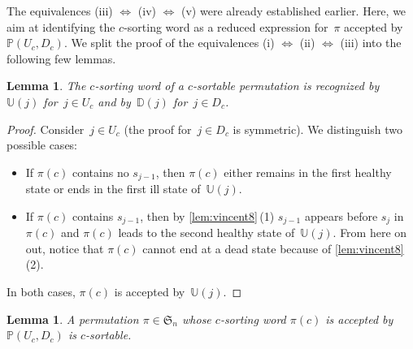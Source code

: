 \documentclass{amsart}
\newtheorem{lemma}[theorem]{Lemma}
\newcommand{\fS}{\mathfrak{S}} %
\newcommand{\automatonP}{\mathbb{P}} %
\newcommand{\automatonU}{\mathbb{U}} %
\newcommand{\automatonD}{\mathbb{D}} %
\begin{document}
The equivalences (iii) $\iff$ (iv) $\iff$ (v) were already established earlier.
Here, we aim at identifying the $c$-sorting word as a reduced expression for~$\pi$ accepted by~$\automatonP(U_c, D_c)$.
We split the proof of the equivalences (i) $\iff$ (ii) $\iff$ (iii) into the following few lemmas.

\begin{lemma}\label{lem:vincent9}
The $c$-sorting word of a $c$-sortable permutation is recognized by~$\automatonU(j)$ for~$j \in U_c$ and by~$\automatonD(j)$ for~$j \in D_c$.
\end{lemma}

\begin{proof}
Consider~$j \in U_c$ (the proof for~$j \in D_c$ is symmetric).
We distinguish two possible cases:
\begin{itemize}
	\item If $\pi(c)$ contains no $s_{j-1}$, then $\pi(c)$ either remains in the first healthy state or ends in the first ill state of~$\automatonU(j)$.
	\item If $\pi(c)$ contains $s_{j-1}$, then by \cref{lem:vincent8}\,(1) $s_{j-1}$ appears before $s_j$ in $\pi(c)$ and $\pi(c)$ leads to the second healthy state of~$\automatonU(j)$. From here on out, notice that $\pi(c)$ cannot end at a dead state because of \cref{lem:vincent8}\,(2). 
\end{itemize}
In both cases, $\pi(c)$ is accepted by~$\automatonU(j)$.
\end{proof}

\begin{lemma}\label{lem:Vincent10}
A permutation $\pi \in \fS_n$ whose $c$-sorting word $\pi(c)$ is accepted by~$\automatonP(U_c, D_c)$ is $c$-sortable.
\end{lemma}
\end{document}
